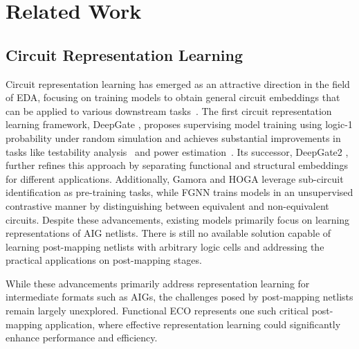 \section{Related Work}
\label{Sec:Related}
\subsection{Circuit Representation Learning}
Circuit representation learning has emerged as an attractive direction in the field of EDA, focusing on training models to obtain general circuit embeddings that can be applied to various downstream tasks~\cite{chen2024large}. The first circuit representation learning framework, DeepGate \cite{li2022deepgate}, proposes supervising model training using logic-1 probability under random simulation and 
achieves substantial improvements in tasks like testability analysis~\cite{shi2022deeptpi} and power estimation~\cite{khan2024deepseq}.  Its successor, DeepGate2 \cite{shi2023deepgate2}, further refines this approach by separating functional and structural embeddings for different applications. Additionally, Gamora \cite{wu2023gamora} and HOGA \cite{deng2024less} leverage sub-circuit identification as pre-training tasks, while FGNN \cite{wang2022functionality} trains models in an unsupervised contrastive manner by distinguishing between equivalent and non-equivalent circuits. Despite these advancements, existing models primarily focus on learning representations of AIG netlists. There is still no available solution capable of learning post-mapping netlists with arbitrary logic cells and addressing the practical applications on post-mapping stages. 

While these advancements primarily address representation learning for intermediate formats such as AIGs, the challenges posed by post-mapping netlists remain largely unexplored. Functional ECO represents one such critical post-mapping application, where effective representation learning could significantly enhance performance and efficiency.

